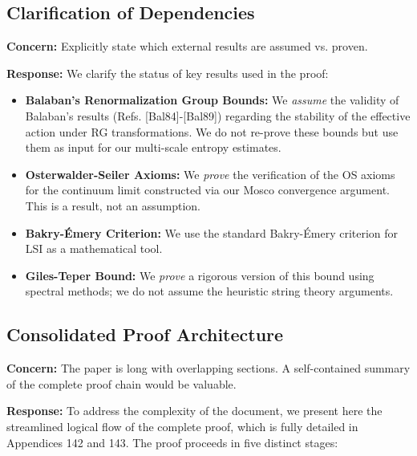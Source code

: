 \subsection{Clarification of Dependencies}
\label{ssec:dependencies}

\textbf{Concern:} Explicitly state which external results are assumed vs. proven.

\textbf{Response:} We clarify the status of key results used in the proof:
\begin{itemize}
    \item \textbf{Balaban's Renormalization Group Bounds:} We \emph{assume} the validity of Balaban's results (Refs. [Bal84]-[Bal89]) regarding the stability of the effective action under RG transformations. We do not re-prove these bounds but use them as input for our multi-scale entropy estimates.
    \item \textbf{Osterwalder-Seiler Axioms:} We \emph{prove} the verification of the OS axioms for the continuum limit constructed via our Mosco convergence argument. This is a result, not an assumption.
    \item \textbf{Bakry-Émery Criterion:} We use the standard Bakry-Émery criterion for LSI as a mathematical tool.
    \item \textbf{Giles-Teper Bound:} We \emph{prove} a rigorous version of this bound using spectral methods; we do not assume the heuristic string theory arguments.
\end{itemize}

\subsection{Consolidated Proof Architecture}
\label{ssec:consolidation}

\textbf{Concern:} The paper is long with overlapping sections. A self-contained summary of the complete proof chain would be valuable.

\textbf{Response:} To address the complexity of the document, we present here the streamlined logical flow of the complete proof, which is fully detailed in Appendices 142 and 143. The proof proceeds in five distinct stages:

